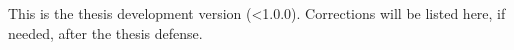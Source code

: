 

\clearpage


\imprimircapa


\imprimirfolhaderosto*


\begin{fichacatalografica}
 
\end{fichacatalografica}


\begin{errata}
  This is the thesis development version (<1.0.0). Corrections will be listed here, if needed, after the thesis defense.
\end{errata}


